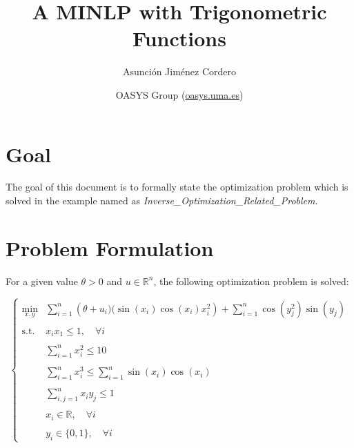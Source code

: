 \documentclass[a4paper,12pt]{article}
\begin{document}
\title{A MINLP with Trigonometric Functions}

\author{Asunci\'on Jim\'enez Cordero}

\date{\small{OASYS Group (\url{oasys.uma.es})}}

\maketitle

\section{Goal}

The goal of this document is to formally state the optimization problem which is solved in the example named as \emph{Inverse\_Optimization\_Related\_Problem}.

\section{Problem Formulation}

For a given value $\theta>0$ and $u\in\mathbb{R}^n$, the following optimization problem is solved:

\begin{equation}
  \left\{
  \begin{array}{cl}
  \min\limits_{x, y} & \sum\limits_{i = 1}^n \left(\theta + u_i)(\sin(x_i)\cos(x_i)x_i^2\right) + \sum\limits_{i = 1}^n \cos(y_j^2)\sin(y_j)\\
  &\\
   \text{s.t. }& x_ix_1\leq 1, \quad \forall i \\
   &\\
   & \sum\limits_{i = 1}^nx_i^2 \leq 10\\
   &\\
   & \sum\limits_{i = 1}^nx_i^3 \leq \sum\limits_{i = 1}^n \sin(x_i)\cos(x_i)\\
   &\\
   & \sum\limits_{i,j = 1}^n x_iy_j \leq 1\\
   &\\
   & x_i \in \mathbb{R}, \quad \forall i\\
   &\\
   & y_i\in\{0,1\}, \quad \forall i
  \end{array}
    \right.
  \end{equation}


%
%
\end{document}
